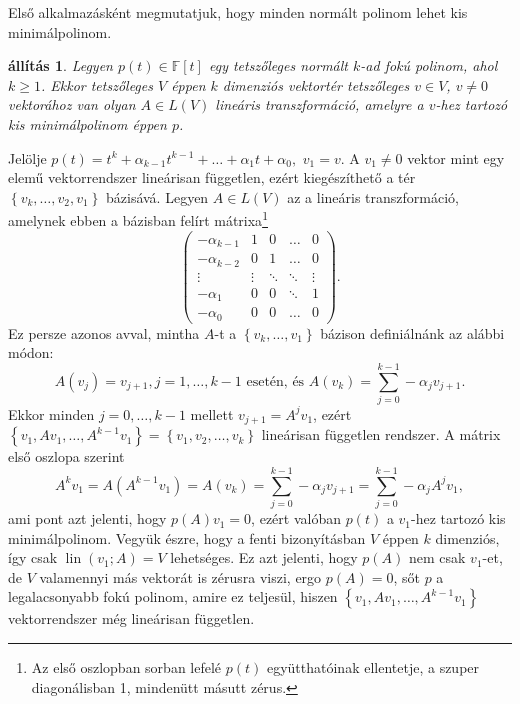\documentclass[a4paper, showtrims]{memoir}
\makeatletter
\renewenvironment{proof}[1][\proofname]
    {\par\pushQED{\qed}%
    \normalfont \topsep6\p@\@plus6\p@\relax
    \trivlist
    \item[\hskip\labelsep
        \itshape
    #1\@addpunct{:}]\ignorespaces}
    {\popQED\endtrivlist\@endpefalse}
\theoremstyle{plain}
\newtheorem{proposition}{állítás}[chapter]
\theoremstyle{remark}
\theoremstyle{definition}
\DeclareMathOperator{\lin}{lin}
\makeatother
\begin{document}
Első alkalmazásként megmutatjuk, hogy minden normált polinom lehet kis minimálpolinom.
\begin{proposition}\label{pr:polinom-kis-minimalpolinom}
    Legyen $p\left( t \right)\in\mathbb{F}\left[ t \right]$ egy tetszőleges normált $k$-ad fokú polinom, ahol $k\geq 1$.
    Ekkor tetszőleges $V$ éppen $k$ dimenziós vektortér tetszőleges $v\in V$, $v\neq 0$ vektorához van olyan $A\in L\left( V \right)$
    lineáris transzformáció, amelyre a $v$-hez tartozó kis minimálpolinom éppen $p$.
\end{proposition}
\begin{proof}
    Jelölje 
    \(
    p\left( t \right)=t^k+\alpha_{k-1}t^{k-1}+\dots+\alpha_1t+\alpha_0,
    \)
    $v_1=v.$ 
    A $v_1\neq 0$ vektor mint egy elemű vektorrendszer lineárisan független, ezért kiegészíthető a tér
    $\left\{ v_k,\ldots,v_2,v_1 \right\}$ bázisává.
    Legyen $A\in L\left( V \right)$ az a lineáris transzformáció, 
    amelynek ebben a bázisban felírt mátrixa\footnote{Az első oszlopban sorban lefelé $p\left( t \right)$ együtthatóinak ellentetje, a szuper diagonálisban 1, mindenütt másutt zérus.}
    \[
        \begin{pmatrix}
            -\alpha_{k-1}&1&0&\dots&0\\
            -\alpha_{k-2}&0&1&\dots&0\\
            \vdots       &\vdots &\ddots & \ddots    &\vdots\\
            -\alpha_1    &0&0&\ddots&1\\
            -\alpha_0    &0&0&\dots&0
        \end{pmatrix}.
    \]
    Ez persze azonos avval, mintha $A$-t a $\left\{ v_k,\ldots,v_1 \right\}$
    bázison definiálnánk az alábbi módon:
    \[
        A\left( v_j \right)=v_{j+1}, j=1,\ldots,k-1\mbox{ esetén, és } 
        A\left( v_k \right)=\sum_{j=0}^{k-1}-\alpha_jv_{j+1}.
    \]
    Ekkor minden $j=0,\ldots,k-1$ mellett $v_{j+1}=A^jv_1$, 
    ezért $\left\{ v_1,Av_1,\ldots,A^{k-1}v_1 \right\}=\left\{ v_1,v_2,\ldots,v_{k} \right\}$ lineárisan független rendszer.
    A mátrix első oszlopa szerint 
    \[
        A^kv_1=
        A\left( A^{k-1}v_1 \right)=
        A\left( v_k \right)=
        \sum_{j=0}^{k-1}-\alpha_jv_{j+1}=
        \sum_{j=0}^{k-1}-\alpha_jA^jv_1,
    \]
    ami pont azt jelenti, hogy $p(A)v_1=0$, 
    ezért valóban $p\left( t \right)$ a $v_1$-hez tartozó kis minimálpolinom.
\end{proof}
Vegyük észre, hogy a fenti bizonyításban
$V$ éppen $k$ dimenziós, így csak $\lin\left( v_1;A \right)=V$ lehetséges.
Ez azt jelenti, hogy $p\left( A \right)$ nem csak $v_1$-et, de $V$ valamennyi más vektorát is zérusra viszi,
ergo $p\left( A \right)=0$, sőt $p$ a legalacsonyabb fokú polinom, amire ez teljesül,
hiszen $\left\{ v_1,Av_1,\ldots,A^{k-1}v_1 \right\}$ vektorrendszer még lineárisan független.
\end{document}
